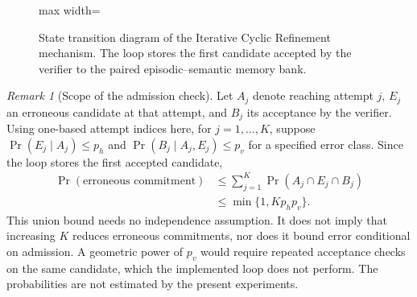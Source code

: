 \documentclass[journal]{IEEEtran}
\theoremstyle{definition}
\theoremstyle{remark}
\newtheorem{remark}[theorem]{Remark}
\begin{document}
\begin{figure}[!t]
\centering
\begin{adjustbox}{max width=\linewidth}\end{adjustbox}
\caption{State transition diagram of the Iterative Cyclic Refinement mechanism. The loop stores the first candidate accepted by the verifier to the paired episodic--semantic memory bank.}
\label{fig:cyclic_refinement}
\end{figure}
\begin{remark}[Scope of the admission check]
Let $A_j$ denote reaching attempt $j$, $E_j$ an erroneous candidate at that attempt, and $B_j$ its acceptance by the verifier. Using one-based attempt indices here, for $j=1,\ldots,K$, suppose
$\Pr(E_j\mid A_j)\leq p_h$ and
$\Pr(B_j\mid A_j,E_j)\leq p_v$ for a specified error class.
Since the loop stores the first accepted candidate,
\begin{equation}
\begin{aligned}
\Pr(\text{erroneous commitment})
&\leq \sum_{j=1}^{K}\Pr(A_j\cap E_j\cap B_j)\\
&\leq \min\{1,Kp_hp_v\}.
\end{aligned}
\end{equation}
This union bound needs no independence assumption. It does not imply that increasing $K$ reduces erroneous commitments, nor does it bound error conditional on admission. A geometric power of $p_v$ would require repeated acceptance checks on the same candidate, which the implemented loop does not perform. The probabilities are not estimated by the present experiments.
\end{remark}
\end{document}
